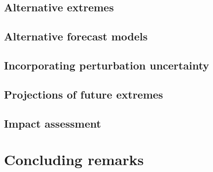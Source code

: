     \blindtext

  \subsection{Alternative extremes}

    \blindtext

  \subsection{Alternative forecast models}

    \blindtext

  \subsection{Incorporating perturbation uncertainty}

    \blindtext

  \subsection{Projections of future extremes}

    \blindtext

  \subsection{Impact assessment}

    \blindtext

\section{Concluding remarks}